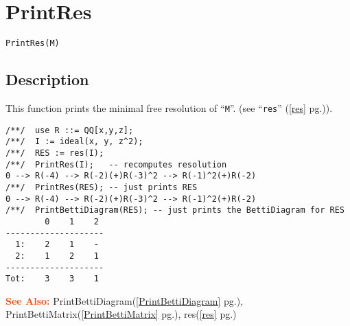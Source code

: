 \documentclass[a4paper]{mybook}
\newenvironment{command}{}{} %
\newcommand\SeeAlso{\par\textcolor{OrangeRed}{\textbf{\large See Also: }}}
\begin{document}
\section{PrintRes}
\label{PrintRes}
\begin{command} %


\begin{Verbatim}[label=syntax, rulecolor=\color{MidnightBlue},
frame=single]
PrintRes(M)
\end{Verbatim}


\subsection*{Description}

This function prints the minimal free resolution of ``\verb&M&''.
(see ``\verb&res&'' (\ref{res} pg.\pageref{res})).
\begin{Verbatim}[label=example, rulecolor=\color{PineGreen}, frame=single]
/**/  use R ::= QQ[x,y,z];
/**/  I := ideal(x, y, z^2);
/**/  RES := res(I);
/**/  PrintRes(I);   -- recomputes resolution
0 --> R(-4) --> R(-2)(+)R(-3)^2 --> R(-1)^2(+)R(-2)
/**/  PrintRes(RES); -- just prints RES
0 --> R(-4) --> R(-2)(+)R(-3)^2 --> R(-1)^2(+)R(-2)
/**/  PrintBettiDiagram(RES); -- just prints the BettiDiagram for RES
        0    1    2
--------------------
  1:    2    1    -
  2:    1    2    1
--------------------
Tot:    3    3    1
\end{Verbatim}


\SeeAlso %
  PrintBettiDiagram(\ref{PrintBettiDiagram} pg.\pageref{PrintBettiDiagram}), 
    PrintBettiMatrix(\ref{PrintBettiMatrix} pg.\pageref{PrintBettiMatrix}), 
    res(\ref{res} pg.\pageref{res})
\end{command} %
\end{document}
